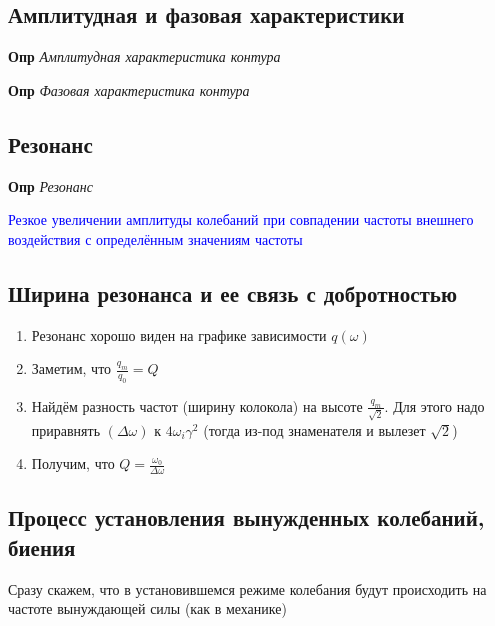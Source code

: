 \documentclass[a4paper, 14pt]{article}
\begin{document}
    \subsection{Амплитудная и фазовая характеристики}
    
    \textbf{Опр} \textit{Амплитудная характеристика контура}
    
    \textbf{Опр} \textit{Фазовая характеристика контура}
    
    \subsection{Резонанс}
    
    \textbf{Опр} \textit{Резонанс}
    
    \textcolor{blue}{Резкое увеличении амплитуды колебаний при совпадении частоты внешнего воздействия с
    определённым значениям частоты}
    
    \subsection{Ширина резонанса и ее связь с добротностью}
    
    \begin{enumerate}
        \item Резонанс хорошо виден на графике зависимости $q(\omega)$
        \item Заметим, что $\frac{q_m}{q_0} = Q$
        \item Найдём разность частот (ширину колокола) на высоте $\frac{q_m}{\sqrt{2}}$.
        Для этого надо приравнять $(\Delta \omega)$ к $4 \omega_i \gamma^2$ (тогда из-под знаменателя и вылезет $\sqrt{2}$)
        \item Получим, что $Q = \frac{\omega_0}{\Delta \omega}$
    \end{enumerate}
    
    \subsection{Процесс установления вынужденных колебаний, биения}
    
    Сразу скажем, что в установившемся режиме колебания будут происходить на частоте вынуждающей силы (как в механике)
    
\end{document}
